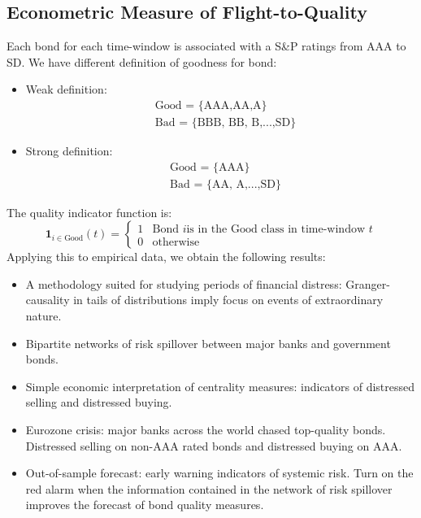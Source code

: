 \subsection{Econometric Measure of Flight-to-Quality}
Each bond for each time-window is associated with a S\&P ratings from AAA to SD. We have different definition of goodness for bond:
\begin{mydefinition}
\begin{itemize}
	\item  Weak definition:
	\begin{align*}
	& \text{Good = \{AAA,AA,A\}}\\
	& \text{Bad = \{BBB, BB, B,...,SD\}}
    \end{align*}
    \item  Strong definition:
    	\begin{align*}
    	& \text{Good = \{AAA\}}\\
    	& \text{Bad = \{AA, A,...,SD\}}
    \end{align*}
\end{itemize}
\end{mydefinition}
The quality indicator function is:
\[
\mathbf{1}_{i \in \text{Good}}(t) = \begin{cases}
	1 & \text{Bond }i \text{is in the Good class in time-window }t\\
	0 & \text{otherwise}
\end{cases}
\]
Applying this to empirical data, we obtain the following results:
\begin{itemize}
\item A methodology suited for studying periods of financial distress: Granger-causality in tails of distributions imply focus on events of extraordinary nature. 
\item Bipartite networks of risk spillover between major banks and government bonds. 
\item Simple economic interpretation of centrality measures: indicators of distressed selling and distressed buying. 
\item Eurozone crisis: major banks across the world chased top-quality bonds. Distressed selling on non-AAA rated bonds and distressed buying on AAA.
\item  Out-of-sample forecast: early warning indicators of systemic risk. Turn on the red alarm when the information contained in the network of risk spillover improves the forecast of bond quality measures.
\end{itemize}
